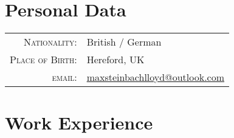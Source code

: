 \documentclass[a4paper,10pt]{article} %
\begin{document}
\pagestyle{empty} %


\par{\bigskip\par} %

\section{Personal Data}

\begin{tabular}{rl}
\textsc{Nationality:} & British / German\\
\textsc{Place of Birth:} & Hereford, UK \\
\textsc{email:} & \href{maxsteinbachlloyd@outlook.com}{maxsteinbachlloyd@outlook.com}
\end{tabular}


\section{Work Experience}
\end{document}
